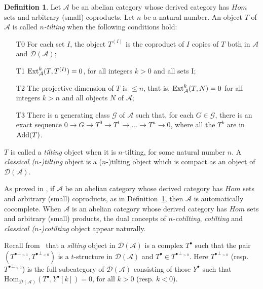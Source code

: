 \documentclass{proc-l}
\newcommand{\Ext}{{\rm Ext}}
\newcommand{\Add}{{\rm Add}}
\theoremstyle{definition}
\newtheorem{definition}[theorem]{Definition}
\theoremstyle{remark}
\numberwithin{equation}{section}
\begin{document}
\begin{definition}\cite{NSZM}\label{ntilting}
Let $\mathcal{A}$ be an abelian category whose derived category has 
$Hom$ sets and arbitrary (small) coproducts.
Let $n$ be a natural number. An object $T$ of $\mathcal{A}$ is called {\it $n$-tilting} when the following conditions hold:
\begin{enumerate}
\item[\rm T0] For each set $I$, the object $T^{(I)}$ is the coproduct of $I$ copies of $T$ both in $\mathcal{A}$ and 
$\mathcal{D}(\mathcal{A})$;
\item[\rm T1] $\Ext_\mathcal{A}^k(T,T^{(I)})=0$, for all integers $k>0$ and all sets I;
\item[\rm T2] The projective dimension of $T$ is $\leq n$, that is, $\Ext_\mathcal{A}^k(T,N)=0$ for all integers $k>n$ and all objects $N$ of 
$\mathcal{A}$;
\item[\rm T3] There is a generating class $\mathcal{G}$ of $\mathcal{A}$ such that, for each $G \in \mathcal{G}$, there is an exact sequence
$0\to G\to T^0\to T^1\to \dots \to T^n\to 0$, where all the $T^k$ are in $\Add(T)$.
\end{enumerate}
$T$ is called a {\it tilting} object when it is $n$-tilting, for some natural number $n$.  A {\it classical ($n$-)tilting} object is a ($n$-)tilting object which is compact as an object of $\mathcal{D}(\mathcal{A})$. 
\end{definition} 

As proved in \cite{NSZM}, if $\mathcal{A}$ be an abelian category whose derived category has 
$Hom$ sets and arbitrary (small) coproducts, as in Definition~\ref{ntilting}, then $\mathcal{A}$ is automatically cocomplete.
When $\mathcal{A}$ is an abelian category whose derived category has $Hom$ sets and arbitrary (small) products, the dual concepts of {\it $n$-cotilting}, {\it cotilting} and {\it classical ($n$-)cotilting} object appear naturally.

Recall from~\cite{PV} that a {\it silting} object in $\mathcal{D}(\mathcal{A})$ is a complex $T^\bullet$ such that the pair 
$({T^\bullet}^{\perp_{>0}}, {T^\bullet}^{\perp_{<0}})$ is a $t$-structure in $\mathcal{D}(\mathcal{A})$ and $T^\bullet\in {T^\bullet }^{\perp_{>0}}$. Here ${T^\bullet}^{\perp_{>0}}$ (resp. ${T^\bullet}^{\perp_{<0}}$) is the full subcategory of $\mathcal{D}(\mathcal{A})$ consisting of those $Y^\bullet$ such that $\text{Hom}_{\mathcal{D}(\mathcal{A})}(T^\bullet ,Y^\bullet [k])=0$, for all $k>0$ (resp. $k<0$).  
\end{document}
